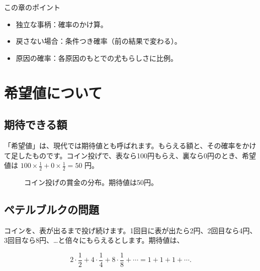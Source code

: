 \documentclass[a4paper,11pt,openany]{ltjsbook}
\begin{document}
\begin{pointbox}{この章のポイント}
\begin{itemize}[leftmargin=1.5em]
\item 独立な事柄：確率のかけ算。
\item 戻さない場合：条件つき確率（前の結果で変わる）。
\item 原因の確率：各原因のもとでの尤もらしさに比例。
\end{itemize}
\end{pointbox}

\chapter{希望値について}

\section{期待できる額}

「希望値」は、現代では期待値とも呼ばれます。もらえる額と、その確率をかけて足したものです。コイン投げで、表なら100円もらえ、裏なら0円のとき、希望値は $100\times\frac12+0\times\frac12=50$ 円。

\begin{figure}[htbp]
\centering
{}
\caption{コイン投げの賞金の分布。期待値は50円。}
\end{figure}

\section{ペテルブルクの問題}

コインを、表が出るまで投げ続けます。1回目に表が出たら2円、2回目なら4円、3回目なら8円、…と倍々にもらえるとします。期待値は、

\[
2\cdot\frac12+4\cdot\frac14+8\cdot\frac18+\cdots=1+1+1+\cdots.
\]
\end{document}
